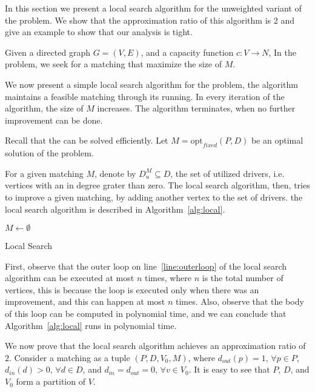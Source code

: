 \label{sub:uwcm}
In this section we present a local search algorithm for the unweighted
variant of the problem.
We show that the approximation ratio of this algorithm is $2$ and give an example
to show that our analysis is tight.

Given a directed graph $G = (V, E)$, 
and a capacity function ${c : V \rightarrow N}$, 
In the \textsc{\UWCARPOOL{}} problem, 
we seek for a matching that maximize the size of $M$.

We now present a simple local search algorithm for the problem, 
the algorithm maintains a feasible matching through its running.
In every iteration of the algorithm, the size of $M$ increases.
The algorithm terminates, when no further improvement can be done. 

Recall that the \FIXEDCARPOOL{} can be solved efficiently.
Let $M = \text{opt}_{fixed}(P, D)$ be an optimal solution of the
\FIXEDCARPOOL{} problem.
%

For a given matching $M$, denote by $D^M_u \subseteq D$, 
the set of utilized drivers, 
i.e. vertices with an in degree grater than zero.
The local search algorithm, then, tries to improve a given matching, 
by adding another vertex to the set of drivers.
the local search algorithm is described in
Algorithm~\ref{alg:local}.

\begin{algorithm}
\label{alg:local}
$M \leftarrow \emptyset$	\\
\caption{Local Search}
\end{algorithm}

First, observe that the outer loop on line~\ref{line:outerloop} of the local search algorithm
can be executed at most $n$ times, 
where $n$ is the total number of vertices, 
this is because the loop is executed only when there was an improvement, 
and this can happen at most $n$ times.
Also, observe that the body of this loop can be computed in polynomial time, 
and we can conclude that Algorithm~\ref{alg:local} runs in polynomial time.
    
We now prove that the local search algorithm achieves an approximation ratio of
$2$.
Consider a matching as a tuple $(P, D, V_0, M)$, 
where $d_{out}(p) = 1, \, \forall p \in P$,
$d_{in}(d) > 0, \, \forall d \in D$,
and $d_{in} = d_{out} = 0, \, \forall v \in V_0$.
It is easy to see that $P$, $D$, and $V_0$ form a partition of $V$.


